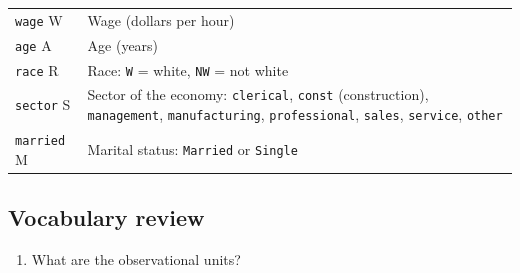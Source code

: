 \documentclass[
]{report}
\providecommand{\tightlist}{%
  \setlength{\itemsep}{0pt}\setlength{\parskip}{0pt}}
\begin{document}
\begin{longtable}[]{@{}ll@{}}
\begin{minipage}[t]{0.08\columnwidth}
\texttt{wage} \textbar{} W\strut
\end{minipage} & \begin{minipage}[t]{0.86\columnwidth}\raggedright
Wage (dollars per hour) \textbar{}\strut
\end{minipage}\tabularnewline
\begin{minipage}[t]{0.08\columnwidth}\raggedright
\texttt{age} \textbar{} A\strut
\end{minipage} & \begin{minipage}[t]{0.86\columnwidth}\raggedright
Age (years) \textbar{}\strut
\end{minipage}\tabularnewline
\begin{minipage}[t]{0.08\columnwidth}\raggedright
\texttt{race} \textbar{} R\strut
\end{minipage} & \begin{minipage}[t]{0.86\columnwidth}\raggedright
Race: \texttt{W} = white, \texttt{NW} = not white \textbar{}\strut
\end{minipage}\tabularnewline
\begin{minipage}[t]{0.08\columnwidth}\raggedright
\texttt{sector} \textbar{} S\strut
\end{minipage} & \begin{minipage}[t]{0.86\columnwidth}\raggedright
Sector of the economy: \texttt{clerical}, \texttt{const} (construction), \texttt{management}, \texttt{manufacturing}, \texttt{professional}, \texttt{sales}, \texttt{service}, \texttt{other} \textbar{}\strut
\end{minipage}\tabularnewline
\begin{minipage}[t]{0.08\columnwidth}\raggedright
\texttt{married} \textbar{} M\strut
\end{minipage} & \begin{minipage}[t]{0.86\columnwidth}\raggedright
Marital status: \texttt{Married} or \texttt{Single} \textbar{}\strut
\end{minipage}\tabularnewline
\bottomrule
\end{longtable}

\hypertarget{vocabulary-review}{%
\subsection{Vocabulary review}\label{vocabulary-review}}

\begin{enumerate}
\def\labelenumi{\arabic{enumi}.}
\tightlist
\item
  What are the observational units?
\end{enumerate}
\end{document}
